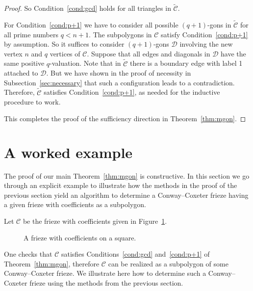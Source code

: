 \documentclass[ALCO,ThmDefs,Unicode,epreuves,published]{cedram}
\numberwithin{equation}{section}
\begin{document}
\begin{proof}
So Condition~\eqref{cond:gcd} holds for all triangles in 
$\widetilde{\mathcal{C}}$.


For Condition~\eqref{cond:p+1} we have to consider all possible $(q+1)$-gons
in $\widetilde{\mathcal{C}}$ for all prime numbers $q<n+1$. The subpolygons 
in $\mathcal{C}$ satisfy Condition~\eqref{cond:p+1} by assumption. 
So it suffices to consider $(q+1)$-gons $\mathcal{D}$ 
involving the new vertex $n$ and $q$
vertices of $\mathcal{C}$. Suppose that all edges and diagonals in $\mathcal{D}$ 
have the same positive $q$-valuation. Note that in $\widetilde{\mathcal{C}}$ there is a boundary
edge with label 1 attached to $\mathcal{D}$. But 
we have shown in the proof of necessity in
Subsection~\ref{sec:necessary} that such a configuration leads to a contradiction. 
Therefore, $\widetilde{\mathcal{C}}$ satisfies Condition~\eqref{cond:p+1},
as needed for the inductive procedure to work. 

This completes the proof of the sufficiency direction in Theorem~\ref{thm:mgon}.
\end{proof}


\section{A worked example}
\label{sec:example}

The proof of our main Theorem~\ref{thm:mgon} is constructive.
In this section we go through an explicit example
to illustrate how the methods in the proof of the previous section yield
an algorithm to determine a Conway--Coxeter frieze having a given
frieze with coefficients as a subpolygon. 

Let $\mathcal{C}$ be the frieze with coefficients given in Figure~\ref{fig:fwc}.

\begin{figure}[htb]\centering
{}

\vspace*{-2mm}
 \caption{A frieze with coefficients on a square. 
 \label{fig:fwc}}
\end{figure}
One checks that $\mathcal{C}$ satisfies Conditions~\eqref{cond:gcd} and~\eqref{cond:p+1}
of Theorem~\ref{thm:mgon}, therefore $\mathcal{C}$ can be realized as a subpolygon of
some Conway--Coxeter frieze. We illustrate here how to determine such a Conway--Coxeter
frieze using the methods from the previous section.
\end{document}
